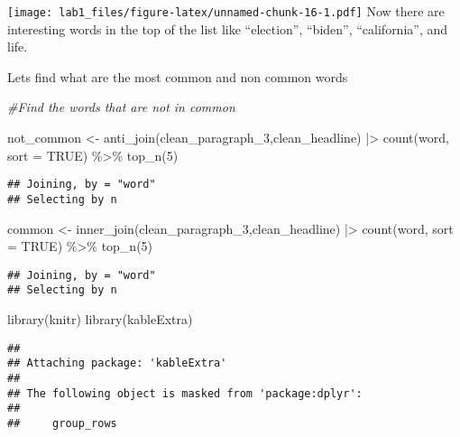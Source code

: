 \documentclass[
]{article}
\newenvironment{Shaded}{\begin{snugshade}}{\end{snugshade}}
\newcommand{\AttributeTok}[1]{\textcolor[rgb]{0.77,0.63,0.00}{#1}}
\newcommand{\CommentTok}[1]{\textcolor[rgb]{0.56,0.35,0.01}{\textit{#1}}}
\newcommand{\ConstantTok}[1]{\textcolor[rgb]{0.00,0.00,0.00}{#1}}
\newcommand{\DecValTok}[1]{\textcolor[rgb]{0.00,0.00,0.81}{#1}}
\newcommand{\FunctionTok}[1]{\textcolor[rgb]{0.00,0.00,0.00}{#1}}
\newcommand{\NormalTok}[1]{#1}
\newcommand{\OtherTok}[1]{\textcolor[rgb]{0.56,0.35,0.01}{#1}}
\newcommand{\SpecialCharTok}[1]{\textcolor[rgb]{0.00,0.00,0.00}{#1}}
\begin{document}
\texttt{[image: lab1\_files/figure-latex/unnamed-chunk-16-1.pdf]} Now
there are interesting words in the top of the list like ``election'',
``biden'', ``california'', and life.

Lets find what are the most common and non common words

\begin{Shaded}
\begin{Highlighting}[]
\CommentTok{\#Find the words that are not in common}

\NormalTok{not\_common }\OtherTok{\textless{}{-}} \FunctionTok{anti\_join}\NormalTok{(clean\_paragraph\_3,clean\_headline) }\SpecialCharTok{|\textgreater{}} 
  \FunctionTok{count}\NormalTok{(word, }\AttributeTok{sort =} \ConstantTok{TRUE}\NormalTok{) }\SpecialCharTok{\%\textgreater{}\%}
  \FunctionTok{top\_n}\NormalTok{(}\DecValTok{5}\NormalTok{)}
\end{Highlighting}
\end{Shaded}

\begin{verbatim}
## Joining, by = "word"
## Selecting by n
\end{verbatim}

\begin{Shaded}
\begin{Highlighting}[]
\NormalTok{common }\OtherTok{\textless{}{-}} \FunctionTok{inner\_join}\NormalTok{(clean\_paragraph\_3,clean\_headline) }\SpecialCharTok{|\textgreater{}} 
  \FunctionTok{count}\NormalTok{(word, }\AttributeTok{sort =} \ConstantTok{TRUE}\NormalTok{) }\SpecialCharTok{\%\textgreater{}\%}
  \FunctionTok{top\_n}\NormalTok{(}\DecValTok{5}\NormalTok{)}
\end{Highlighting}
\end{Shaded}

\begin{verbatim}
## Joining, by = "word"
## Selecting by n
\end{verbatim}

\begin{Shaded}
\begin{Highlighting}[]
\FunctionTok{library}\NormalTok{(knitr)}
\FunctionTok{library}\NormalTok{(kableExtra)}
\end{Highlighting}
\end{Shaded}

\begin{verbatim}
## 
## Attaching package: 'kableExtra'
## 
## The following object is masked from 'package:dplyr':
## 
##     group_rows
\end{verbatim}
\end{document}
